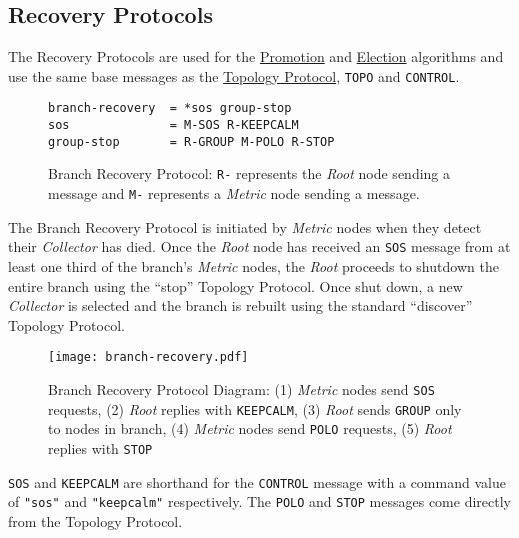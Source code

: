 \subsection{Recovery Protocols}
\label{proto_reco}

The \dcamp Recovery Protocols are used for the \hyperref[algor_promo]{Promotion} and \hyperref[algor_elect]{Election}
algorithms and use the same base messages as the \hyperref[proto_topo]{Topology Protocol}, \texttt{TOPO} and
\texttt{CONTROL}.

\begin{figure}[H]
\vspace{+10pt}
\begin{verbatim}
branch-recovery  = *sos group-stop
sos              = M-SOS R-KEEPCALM
group-stop       = R-GROUP M-POLO R-STOP
\end{verbatim}
\vspace{-5pt}
\caption[Branch Recovery Protocol]
	{Branch Recovery Protocol: \texttt{R-} represents the \textit{Root} node sending a message and \texttt{M-}
	 represents a \textit{Metric} node sending a message.}
\label{fig:proto_reco_branch_spec}
\end{figure}

The Branch Recovery Protocol is initiated by \textit{Metric} nodes when they detect their \textit{Collector} has died.
Once the \textit{Root} node has received an \texttt{SOS} message from at least one third of the branch's \textit{Metric}
nodes, the \textit{Root} proceeds to shutdown the entire branch using the ``stop'' Topology Protocol. Once shut down, a
new \textit{Collector} is selected and the branch is rebuilt using the standard ``discover'' Topology Protocol.

\begin{figure}[H]
    \centering
    \texttt{[image: branch-recovery.pdf]}
    \label{fig:proto_branch_reco_image}
    \caption[Branch Recovery Protocol Diagram]
	    {Branch Recovery Protocol Diagram: (1) \textit{Metric} nodes send \texttt{SOS} requests, (2) \textit{Root}
	     replies with \texttt{KEEPCALM}, (3) \textit{Root} sends \texttt{GROUP} only to nodes in branch, (4)
	     \textit{Metric} nodes send \texttt{POLO} requests, (5) \textit{Root} replies with \texttt{STOP}}
\end{figure}

\texttt{SOS} and \texttt{KEEPCALM} are shorthand for the \texttt{CONTROL} message with a command value of \texttt{"sos"}
and \texttt{"keepcalm"} respectively. The \texttt{POLO} and \texttt{STOP} messages come directly from the Topology
Protocol.

